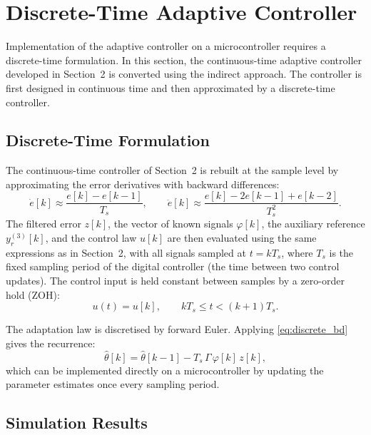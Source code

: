 \section{Discrete-Time Adaptive Controller}

Implementation of the adaptive controller on a microcontroller requires a discrete-time formulation. In this section, the continuous-time adaptive controller developed in Section~2 is converted using the indirect approach. The controller is first designed in continuous time and then approximated by a discrete-time controller.

\subsection{Discrete-Time Formulation}

The continuous-time controller of Section~2 is rebuilt at the sample level by approximating the error derivatives with backward differences:
\begin{equation}
\dot{e}[k] \approx \frac{e[k]-e[k-1]}{T_s},
\qquad
\ddot{e}[k] \approx \frac{e[k]-2e[k-1]+e[k-2]}{T_s^2}.
\label{eq:discrete_bd}
\end{equation}
The filtered error \(z[k]\), the vector of known signals \(\varphi[k]\), the auxiliary reference \(y_r^{(3)}[k]\), and the control law \(u[k]\) are then evaluated using the same expressions as in Section~2, with all signals sampled at \(t=kT_s\), where \(T_s\) is the fixed sampling period of the digital controller (the time between two control updates). The control input is held constant between samples by a zero-order hold (ZOH):
\begin{equation}
u(t) = u[k], \qquad kT_s \le t < (k+1)T_s.
\end{equation}

\noindent The adaptation law is discretised by forward Euler. Applying \eqref{eq:discrete_bd} gives the recurrence:
\begin{equation}
\hat{\theta}[k]
=
\hat{\theta}[k-1]
- T_s\,\Gamma\,\varphi[k]\,z[k],
\label{eq:discrete_adaptation_law}
\end{equation}
which can be implemented directly on a microcontroller by updating the parameter estimates once every sampling period.

\subsection{Simulation Results}

